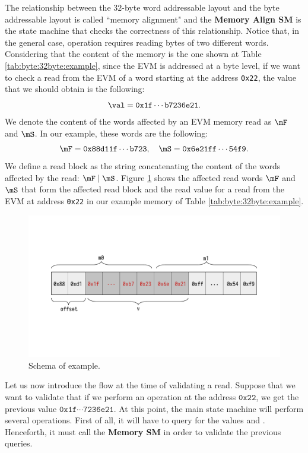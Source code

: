 The relationship between the $32$-byte word addressable layout and the byte addressable layout is called ``memory alignment" and the \textbf{Memory Align SM} is the state machine that checks the correctness of this relationship. Notice that, in the general case, \MLOAD operation requires reading bytes of two different words. Considering that the content of the memory is the one shown at Table \ref{tab:byte:32byte:example}, since the EVM is addressed at a byte level, if we want to check a read from the EVM of a word starting at the address \texttt{0x22}, the value that we should obtain is the following:
\[
\val = \mathtt{0x1f \cdots b7236e21}.
\]
We denote the content of the words affected by an EVM memory read as $\mF$ and $\mS$.
In our example, these words are the following:
\[
\mF = \mathtt{0x} \mathtt{88d11f} \cdots \mathtt{b723},
\quad \mS =  \mathtt{0x} \mathtt{6e21ff} \cdots \mathtt{54f9}.
\]
We define a read block as the string concatenating the content of the words affected by the read: $\mF \mid \mS$.
Figure \ref{fig:mload-ex} shows the affected read words $\mF$ and $\mS$ that form the affected read block 
and the read value \val for a read from the EVM at address \texttt{0x22} in our example memory of Table \ref{tab:byte:32byte:example}.

\begin{figure}[h!]
    \centering
    \includegraphics[width=1\columnwidth, trim=0 5cm 0 4cm, clip]{../figures/mload_ex}
    \caption{Schema of \MLOAD example.}
    \label{fig:mload-ex}
\end{figure}

Let us now introduce the flow at the time of validating a read. Suppose that we want to validate that if we perform an \MLOAD operation at the address $\mathtt{0x22}$, we get the previous value $\mathtt{0x1f\dotsb7236e21}$. At this point, the main state machine will perform several operations. First of all, it will have to query for the values \mF and \mS. Henceforth, it must call the \textbf{Memory SM} in order to validate the previous queries. 

